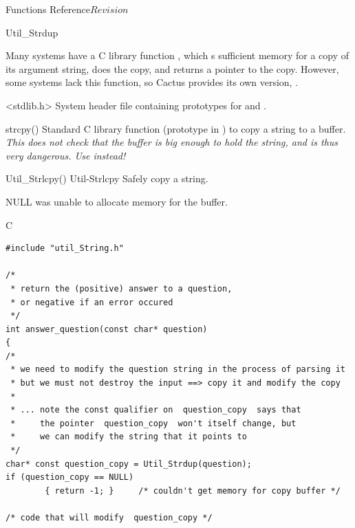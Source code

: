 \begin{cactuspart}{ Functions Reference}{}{$Revision$}
\begin{FunctionDescription}{Util\_Strdup}
\begin{Discussion}
Many systems have a C library function , which
s sufficient memory for a copy of its argument string,
does the copy, and returns a pointer to the copy.  However, some
systems lack this function, so Cactus provides its own version,
.
\end{Discussion}

\begin{SeeAlsoSection}
\begin{SeeAlso}{<stdlib.h>}
System header file containing prototypes for
 and .
\end{SeeAlso}
\begin{SeeAlso}{strcpy()}
Standard C library function (prototype in )
to copy a string to a buffer.
{\em This does not check that the buffer is big enough to hold the string,
and is thus very dangerous.  Use  instead!}
\end{SeeAlso}
\begin{SeeAlso2} {Util\_Strlcpy()} {Util-Strlcpy}
Safely copy a string.
\end{SeeAlso2}
\end{SeeAlsoSection}

\begin{ErrorSection}
\begin{Error}{NULL}
 was unable to allocate memory for the buffer.
\end{Error}
\end{ErrorSection}

\begin{ExampleSection}
\begin{Example}{C}
\begin{verbatim}
#include "util_String.h"

/*
 * return the (positive) answer to a question,
 * or negative if an error occured
 */
int answer_question(const char* question)
{
/*
 * we need to modify the question string in the process of parsing it
 * but we must not destroy the input ==> copy it and modify the copy
 *
 * ... note the const qualifier on  question_copy  says that
 *     the pointer  question_copy  won't itself change, but
 *     we can modify the string that it points to
 */
char* const question_copy = Util_Strdup(question);
if (question_copy == NULL)
        { return -1; }     /* couldn't get memory for copy buffer */

/* code that will modify  question_copy */


\end{verbatim}
\end{Example}
\end{ExampleSection}
\end{FunctionDescription}
\end{cactuspart}
